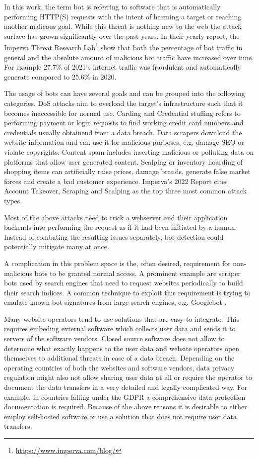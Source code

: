 \documentclass[
    fontsize=12pt,
    headings=small,
    parskip=half,           %
    bibliography=totoc,
    numbers=noenddot,       %
    open=any,               %
    final,                   %
    table
]{scrreprt}
\begin{document}
In this work, the term bot is referring to software that is automatically performing HTTP(S) requests with the intent of harming a target or reaching another malicous goal. While this threat is nothing new to the web the attack surface has grown significantly over the past years. In their yearly report, the Imperva Threat Research Lab\footnote{\url{https://www.imperva.com/blog/}} show that both the percentage of bot traffic in general and the absolute amount of malicious bot traffic have increased over time.\cite{BAD_BOT_REPORT2020,BAD_BOT_REPORT2021,BAD_BOT_REPORT2022} For example 27.7\% of 2021's internet traffic was fraudulent and automatically generate compared to 25.6\% in 2020.

The usage of bots can have several goals and can be grouped into the following categories. DoS attacks aim to overload the target's infrastructure such that it becomes inaccessible for normal use. Carding and Credential stuffing refers to performing payment or login requests to find working credit card numbers and credentials usually obtainend from a data breach. Data scrapers download the website information and can use it for malicious purposes, e.g. damage SEO or violate copyrights. Content spam includes inserting malicious or polluting data on platforms that allow user generated content. Scalping or inventory hoarding of shopping items can artificially raise prices, damage brands, generate false market forces and create a bad customer experience. Imperva's 2022 Report\cite{BAD_BOT_REPORT2022} cites Account Takeover, Scraping and Scalping as the top three most common attack types.

Most of the above attacks need to trick a webserver and their application backends into performing the request as if it had been initiated by a human. Instead of combating the resulting issues separately, bot detection could potentially mitigate many at once.

A complication in this problem space is the, often desired, requirement for non-malicious bots to be granted normal access. A prominent example are scraper bots used by search engines that need to request websites periodically to build their search indices. A common technique to exploit this requirement is trying to emulate known bot signatures from large search engines, e.g. Googlebot \cite{8421894}.

Many website operators tend to use solutions that are easy to integrate. This requires embeding external software which collects user data and sends it to servers of the software vendors. Closed source software does not allow to determine what exactly happens to the user data and website operators open themselves to additional threats in case of a data breach. Depending on the operating countries of both the websites and software vendors, data privacy regulation might also not allow sharing user data at all or require the operator to document the data transfers in a very detailed and legally complicated way. For example, in countries falling under the GDPR \cite{GDPR} a comprehensive data protection documentation is required. Because of the above reasons it is desirable to either employ self-hosted software or use a solution that does not require user data transfers.
\end{document}
